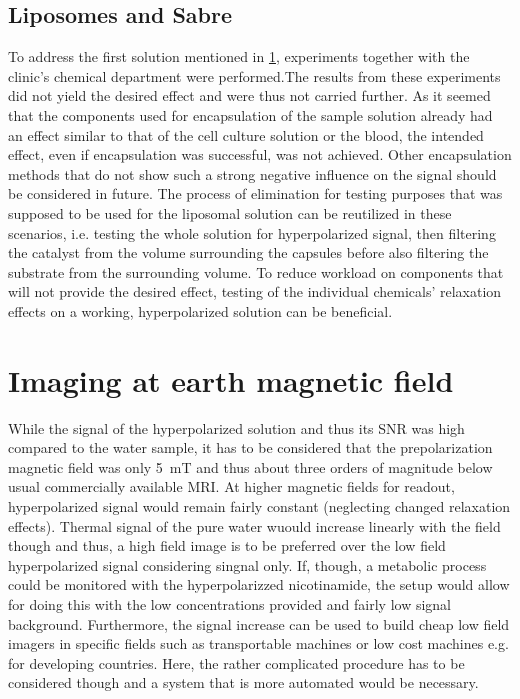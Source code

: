         \subsection{Liposomes and Sabre}
        \label{dc:subsec:liposomes}
        To address the first solution mentioned in \ref{}, experiments together with the clinic's chemical department were performed.The results from these experiments did not yield the desired effect and were thus not carried further. As it seemed that the components used for encapsulation of the sample solution already had an effect similar to that of the cell culture solution or the blood, the intended effect, even if encapsulation was successful, was not achieved. Other encapsulation methods that do not show such a strong negative influence on the signal should be considered in future. The process of elimination for testing purposes that was supposed to be used for the liposomal solution can be reutilized in these scenarios, i.e. testing the whole solution for hyperpolarized signal, then filtering the catalyst from the volume surrounding the capsules before also filtering the substrate from the surrounding volume. To reduce workload on components that will not provide the desired effect, testing of the individual chemicals' relaxation effects on a working, hyperpolarized solution can be beneficial.
    \section{Imaging at earth magnetic field}
        While the signal of the hyperpolarized solution and thus its SNR was high compared to the water sample, it has to be considered that the prepolarization magnetic field was only \SI{5}{\milli\tesla} and thus about three orders of magnitude below usual commercially available MRI. At higher magnetic fields for readout, hyperpolarized signal would remain fairly constant (neglecting changed relaxation effects). Thermal signal of the pure water wuould increase linearly with the field though and thus, a high field image is to be preferred over the low field hyperpolarized signal considering singnal only. If, though, a metabolic process could be monitored with the hyperpolarizzed nicotinamide, the setup would allow for doing this with the low concentrations provided and fairly low signal background. Furthermore, the signal increase can be used to build cheap low field imagers in specific fields such as transportable machines or low cost machines e.g. for developing countries. Here, the rather complicated procedure has to be considered though and a system that is more automated would be necessary.
